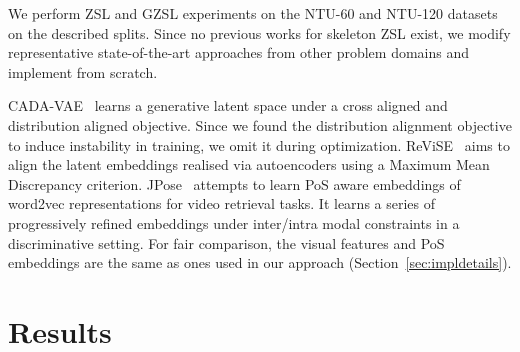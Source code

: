 \documentclass{article}
\begin{document}
We perform ZSL and GZSL experiments on the NTU-60 and NTU-120 datasets on the described splits. Since no previous works for skeleton ZSL exist, we modify representative state-of-the-art approaches from other problem domains and implement from scratch. 

CADA-VAE~\cite{schonfeld2019generalized} learns a generative latent space under a cross aligned and distribution aligned objective. Since we found the distribution alignment objective to induce instability in training, we omit it during optimization. ReViSE~\cite{hubert2017learning} aims to align the latent embeddings realised via autoencoders using a Maximum Mean Discrepancy criterion. JPose~\cite{wray2019fine} attempts to learn PoS aware embeddings of word2vec representations for video retrieval tasks. It learns a series of progressively refined embeddings under inter/intra modal constraints in a discriminative setting. For fair comparison, the visual features and PoS embeddings are the same as ones used in our approach (Section~\ref{sec:impldetails}). 


\begin{table}[!t]
\renewcommand{\arraystretch}{1.3}
\centering
{}
\caption{SynSE ZSL accuracy (\%) on the NTU-60 dataset for various ablations (55/5 split).}
\label{tab:AbZSL}
\end{table}

\section{Results}
\label{sec:res}
\end{document}
